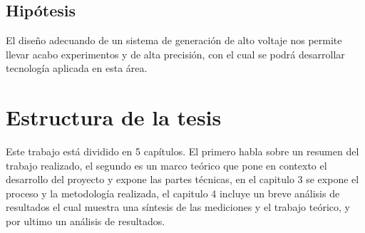 \subsection{Hipótesis}
El diseño adecuando de un sistema de generación de alto voltaje nos permite llevar acabo experimentos y de alta precisión, con el cual se podrá desarrollar tecnología aplicada en esta área.

\newpage


\section{Estructura de la tesis}

Este trabajo está dividido en 5 capítulos. El primero habla sobre un resumen del trabajo realizado, el segundo es un marco teórico que pone en contexto el desarrollo del proyecto y expone las partes técnicas, en el capitulo 3 se expone el proceso y la metodología realizada, el capitulo 4 incluye un breve análisis de resultados el cual muestra una síntesis de las mediciones y el trabajo teórico, y por ultimo un análisis de resultados. 